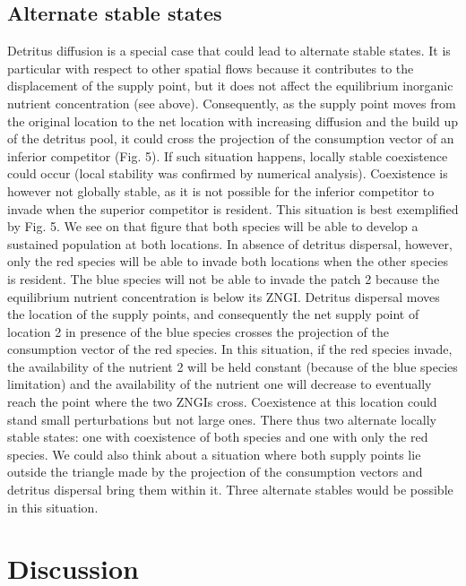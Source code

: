 \documentclass[12pt]{paper}
\begin{document}
\subsection{Alternate stable states}

Detritus diffusion is a special case that could lead to alternate stable states. It is particular with respect to other spatial flows because it contributes to the displacement of the supply point, but it does not affect the equilibrium inorganic nutrient concentration (see above). Consequently, as the supply point moves from the original location to the net location with increasing diffusion and the build up of the detritus pool, it could cross the projection of the consumption vector of an inferior competitor (Fig. 5). If such situation happens, locally stable coexistence could occur (local stability was confirmed by numerical analysis). Coexistence is however not globally stable, as it is not possible for the inferior competitor to invade when the superior competitor is resident. This situation is best exemplified by Fig. 5. We see on that figure that both species will be able to develop a sustained population at both locations. In absence of detritus dispersal, however, only the red species will be able to invade both locations when the other species is resident. The blue species will not be able to invade the patch 2 because the equilibrium nutrient concentration is below its ZNGI. Detritus dispersal moves the location of the supply points, and consequently the net supply point of location 2 in presence of the blue species crosses the projection of the consumption vector of the red species. In this situation, if the red species invade, the availability of the nutrient 2 will be held constant (because of the blue species limitation) and the availability of the nutrient one will decrease to eventually reach the point where the two ZNGIs cross. Coexistence at this location could stand small perturbations but not large ones. There thus two alternate locally stable states: one with coexistence of both species and one with only the red species. We could also think about a situation where both supply points lie outside the triangle made by the projection of the consumption vectors and detritus dispersal bring them within it. Three alternate stables would be possible in this situation. 

\section{Discussion}
\end{document}
